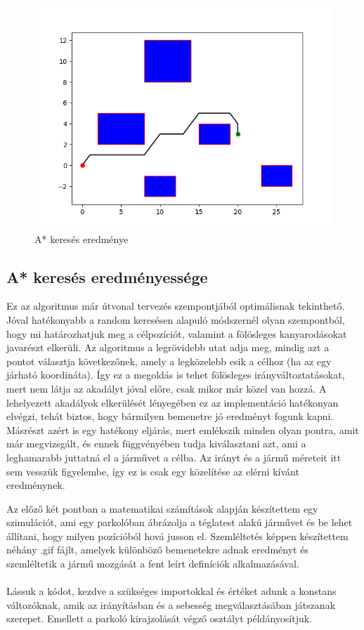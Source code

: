 \begin{figure}[h!]
\centering
\includegraphics[scale=0.75]{images/a_star.png}
\caption{A* keresés eredménye}
\label{fig:a_star}
\end{figure}

\newpage

\subsection{A* keresés eredményessége}
Ez az algoritmus már útvonal tervezés szempontjából optimálisnak tekinthető. Jóval hatékonyabb a random keresésen alapuló módszernél olyan szempontból, hogy mi határozhatjuk meg a célpozíciót, valamint a fölösleges kanyarodásokat javarészt elkerüli. Az algoritmus a legrövidebb utat adja meg, mindig azt a pontot választja következőnek, amely a legközelebb esik a célhoz (ha az egy járható koordináta). Így ez a megoldás is tehet fölösleges irányváltoztatásokat, mert nem látja az akadályt jóval előre, csak mikor már közel van hozzá. A lehelyezett akadályok elkerülését lényegében ez az implementáció hatékonyan elvégzi, tehát biztos, hogy bármilyen bemenetre jó eredményt fogunk kapni. Másrészt azért is egy hatékony eljárás, mert emlékszik minden olyan pontra, amit már megvizsgált, és ennek függvényében tudja kiválasztani azt, ami a leghamarabb juttatná el a járművet a célba. Az irányt és a jármű méreteit itt sem vesszük figyelembe, így ez is csak egy közelítése az elérni kívánt eredménynek.


Az előző két pontban a matematikai számítások alapján készítettem egy szimulációt, ami egy parkolóban ábrázolja a téglatest alakú járművet és be lehet állítani, hogy milyen pozícióból hová jusson el. Szemléltetés képpen készítettem néhány .gif fájlt, amelyek különböző bemenetekre adnak eredményt és szemléltetik a jármű mozgását a fent leírt definíciók alkalmazásával.
\\\\
Lássuk a kódot, kezdve a szükséges importokkal és értéket adunk a konstans változóknak, amik az irányításban és a sebesség megválasztásában játszanak szerepet. Emellett a parkoló kirajzolását végző osztályt példányosítjuk.
\\\\

